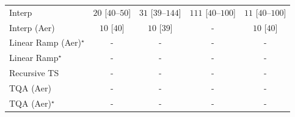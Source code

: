\begin{tabular}{l|cccc|}
Interp & {\cellcolor[HTML]{F5FBF3}} \color[HTML]{000000} $20$ [$40$--$50$] & {\cellcolor[HTML]{F2FAF0}} \color[HTML]{000000} $31$ [$39$--$144$] & {\cellcolor[HTML]{DFF3DA}} \color[HTML]{000000} $111$ [$40$--$100$] & {\cellcolor[HTML]{F7FCF5}} \color[HTML]{000000} $11$ [$40$--$100$] \\
Interp (Aer) & {\cellcolor[HTML]{F7FCF5}} \color[HTML]{000000} $10$ [$40$] & {\cellcolor[HTML]{F7FCF5}} \color[HTML]{000000} $10$ [$39$] & {\cellcolor[HTML]{000000}} \color[HTML]{F1F1F1} {\cellcolor{white}} \color{black} - & {\cellcolor[HTML]{F7FCF5}} \color[HTML]{000000} $10$ [$40$] \\
Linear Ramp (Aer)$^\star$ & {\cellcolor[HTML]{000000}} \color[HTML]{F1F1F1} {\cellcolor{white}} \color{black} - & {\cellcolor[HTML]{000000}} \color[HTML]{F1F1F1} {\cellcolor{white}} \color{black} - & {\cellcolor[HTML]{000000}} \color[HTML]{F1F1F1} {\cellcolor{white}} \color{black} - & {\cellcolor[HTML]{000000}} \color[HTML]{F1F1F1} {\cellcolor{white}} \color{black} - \\
Linear Ramp$^\star$ & {\cellcolor[HTML]{000000}} \color[HTML]{F1F1F1} {\cellcolor{white}} \color{black} - & {\cellcolor[HTML]{000000}} \color[HTML]{F1F1F1} {\cellcolor{white}} \color{black} - & {\cellcolor[HTML]{000000}} \color[HTML]{F1F1F1} {\cellcolor{white}} \color{black} - & {\cellcolor[HTML]{000000}} \color[HTML]{F1F1F1} {\cellcolor{white}} \color{black} - \\
Recursive TS & {\cellcolor[HTML]{000000}} \color[HTML]{F1F1F1} {\cellcolor{white}} \color{black} - & {\cellcolor[HTML]{000000}} \color[HTML]{F1F1F1} {\cellcolor{white}} \color{black} - & {\cellcolor[HTML]{000000}} \color[HTML]{F1F1F1} {\cellcolor{white}} \color{black} - & {\cellcolor[HTML]{000000}} \color[HTML]{F1F1F1} {\cellcolor{white}} \color{black} - \\
TQA (Aer) & {\cellcolor[HTML]{000000}} \color[HTML]{F1F1F1} {\cellcolor{white}} \color{black} - & {\cellcolor[HTML]{000000}} \color[HTML]{F1F1F1} {\cellcolor{white}} \color{black} - & {\cellcolor[HTML]{000000}} \color[HTML]{F1F1F1} {\cellcolor{white}} \color{black} - & {\cellcolor[HTML]{000000}} \color[HTML]{F1F1F1} {\cellcolor{white}} \color{black} - \\
TQA (Aer)$^\star$ & {\cellcolor[HTML]{000000}} \color[HTML]{F1F1F1} {\cellcolor{white}} \color{black} - & {\cellcolor[HTML]{000000}} \color[HTML]{F1F1F1} {\cellcolor{white}} \color{black} - & {\cellcolor[HTML]{000000}} \color[HTML]{F1F1F1} {\cellcolor{white}} \color{black} - & {\cellcolor[HTML]{000000}} \color[HTML]{F1F1F1} {\cellcolor{white}} \color{black} - \\

\end{tabular}
